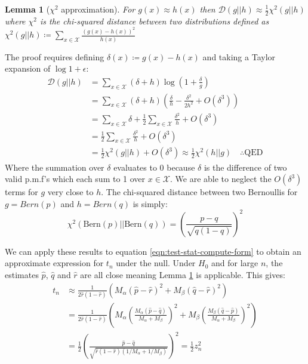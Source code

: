 \documentclass[]{article}
\newcommand{\Xcal}{\mathcal{X}}
\newcommand{\kl}{\mathcal{D}}
\newtheorem{lemma}[theorem]{Lemma}
\begin{document}
\begin{multicols*}{2}
%
\begin{lemma}[$\chi^2$ approximation]
	\label{lem:kl-approx-chi}
	For $g(x) \approx h(x)$ then $\kl(g || h) \approx \frac{1}{2} \chi^2(g || h)$ where $\chi^2$ is the chi-squared distance between two distributions defined as $\chi^2(g || h) \coloneqq \sum_{x \in \Xcal} \frac{(g(x)-h(x))^2}{h(x)}$ 
\end{lemma}

The proof requires defining $\delta(x) \coloneqq g(x) - h(x)$ and taking a Taylor expansion of $\log 1 + \epsilon$:
%
\begin{align*}
	\kl(g||h) &= \sum_{x \in \Xcal} (\delta + h) \log \left(1 + \frac{\delta}{g} \right) \\
	&= \sum_{x \in \Xcal} (\delta + h) \left( \frac{\delta}{h} - \frac{\delta^2}{2h^2} + O(\delta^3) \right)  \\
	&= \sum_{x \in \Xcal} \delta + \frac{1}{2} \sum_{x \in \Xcal} \frac{\delta^2}{h} + O(\delta^3) \\
	&= \frac{1}{2} \sum_{x \in \Xcal} \frac{\delta^2}{h} + O(\delta^3) \\
	&= \frac{1}{2} \chi^2(g||h) + O(\delta^3) \approx \frac{1}{2} \chi^2(h||g) \quad \therefore \textrm{QED}
\end{align*}
%
Where the summation over $\delta$ evaluates to 0 because $\delta$ is the difference of two valid p.m.f's which each sum to 1 over $x \in \Xcal$. We are able to neglect the $O(\delta^3)$ terms for $g$ very close to $h$. The chi-squared distance between two Bernoullis for $g = Bern(p)$ and $h = Bern(q)$ is simply:
%
\begin{equation}
\chi^2(\textrm{Bern}(p) || \textrm{Bern}(q)) = \left( \frac{p-q}{\sqrt{q(1-q)}} \right)^2
\end{equation}

We can apply these results to equation \ref{eqn:test-stat-compute-form} to obtain an approximate expression for $t_n$ under the null. Under $H_0$ and for large $n$, the estimates $\hat{p}$, $\hat{q}$ and $\hat{r}$ are all close meaning Lemma \ref{lem:kl-approx-chi} is applicable. This gives:
%
\begin{align}
	t_n &\approx \frac{1}{2 \hat{r}(1 - \hat{r})} \left( 
	M_\alpha \left(\hat{p} - \hat{r}\right)^2 +
	M_\beta \left(\hat{q} - \hat{r} \right)^2 
	\right) \nonumber \\
	&= \frac{1}{2 \hat{r}(1-\hat{r})} \left( 
	M_\alpha \left(\frac{M_\alpha (\hat{p} - \hat{q})}{M_\alpha + M_\beta} \right)^2 +
	M_\beta \left(\frac{M_\beta (\hat{q} - \hat{p})}{M_\alpha + M_\beta} \right)^2
	\right) \nonumber \\
	&= \frac{1}{2} \left( \frac{\hat{p} - \hat{q}}{\sqrt{\hat{r}(1- \hat{r})(1/M_\alpha + 1/M_\beta)}} \right)^2
	= \frac{1}{2} z_n^2
\end{align}


\end{multicols*}
\end{document}
